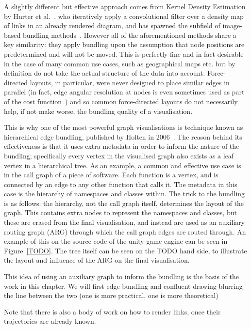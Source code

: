 A slightly different but effective approach comes from Kernel Density Estimation by Hurter et al.~\cite{TODO}, who iteratively apply a convolutional filter over a density map of links in an already rendered diagram, and has spawned the subfield of image-based bundling methods~\cite{TODO,TODO,TODO}.
However all of the aforementioned methods share a key similarity: they apply bundling upon the assumption that node positions are predetermined and will not be moved. This is perfectly fine and in fact desirable in the case of many common use cases, such as geographical maps etc. but by definition do not take the actual structure of the data into account. Force-directed layouts, in particular, were never designed to place similar edges in parallel (in fact, edge angular resolution at nodes is even sometimes used as part of the cost function~\cite{TODO}) and so common force-directed layouts do not necessarily help, if not make worse, the bundling quality of a visualisation.

This is why one of the most powerful graph visualisations is technique known as hierarchical edge bundling, published by Holten in 2006~\cite{TODO}. The reason behind its effectiveness is that it uses extra metadata in order to inform the nature of the bundling; specifically every vertex in the visualised graph also exists as a leaf vertex in a hierarchical tree. As an example, a common and effective use case is in the call graph of a piece of software. Each function is a vertex, and is connected by an edge to any other function that calls it. The metadata in this case is the hierarchy of namespaces and classes within.
The trick to the bundling is as follows: the hierarchy, not the call graph itself, determines the layout of the graph. This contains extra nodes to represent the namespaces and classes, but these are erased from the final visualisation, and instead are used as an auxiliary routing graph (ARG) through which the call graph edges are routed through.
An example of this on the source code of the unity game engine can be seen in Figure~\ref{TODO}. The tree itself can be seen on the TODO hand side, to illustrate the layout and influence of the ARG on the final visualisation.

This idea of using an auxiliary graph to inform the bundling is the basis of the work in this chapter. We will first
edge bundling and confluent drawing
blurring the line between the two (one is more practical, one is more theoretical)


Note that there is also a body of work on how to render links, once their trajectories are already known.


